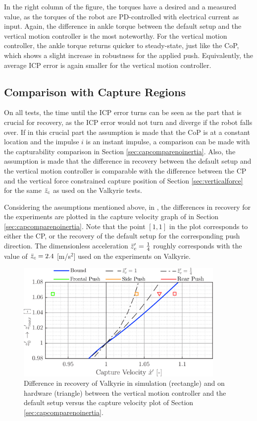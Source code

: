 In the right column of the figure, the torques have a desired and a measured value, as the torques of the robot are PD-controlled with electrical current as input. Again, the difference in ankle torque between the default setup and the vertical motion controller is the most noteworthy. For the vertical motion controller, the ankle torque returns quicker to steady-state, just like the \ac{CoP}, which shows a slight increase in robustness for the applied push. Equivalently, the average \ac{ICP} error is again smaller for the vertical motion controller.

\subsection{Comparison with Capture Regions}
On all tests, the time until the \ac{ICP} error turns can be seen as the part that is crucial for recovery, as the \ac{ICP} error would not turn and diverge if the robot falls over. If in this crucial part the assumption is made that the \ac{CoP} is at a constant location and the impulse $i$ is an instant impulse, a comparison can be made with the capturability comparison in Section \ref{sec:capcomparenoinertia}. Also, the assumption is made that the difference in recovery between the default setup and the vertical motion controller is comparable with the difference between the \ac{CP} and the vertical force constrained capture position of Section \ref{sec:verticalforce} for the same $\ddot{z}_{c}$ as used on the Valkyrie tests.

Considering the assumptions mentioned above, in , the differences in recovery for the experiments are plotted in the capture velocity graph of  in Section \ref{sec:capcomparenoinertia}. Note that the point $[1,1]$ in the plot corresponds to either the \ac{CP}, or the recovery of the default setup for the corresponding push direction. The dimensionless acceleration $\ddot{z}_{c}'=\frac{1}{4}$ roughly corresponds with the value of $\ddot{z}_{c}=2.4$ [m/s$^2$] used on the experiments on Valkyrie. 
\begin{figure}
\centering
\includegraphics[width=0.9\textwidth]{STYLESTUFF/regioncomparison.png}
\caption{Difference in recovery of Valkyrie in simulation (rectangle) and on hardware (triangle) between the vertical motion controller and the default setup versus the capture velocity plot of Section \ref{sec:capcomparenoinertia}.}
\label{fig:regioncomparison}
\end{figure}

